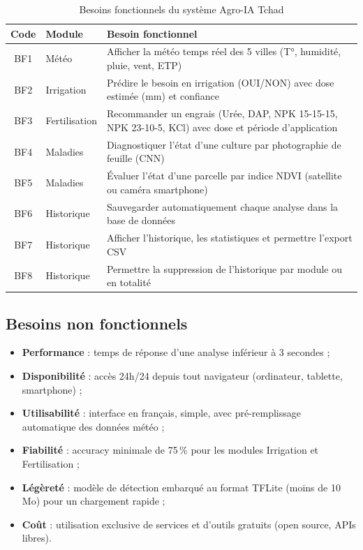 \begin{table}[H]
	\centering
	\caption{Besoins fonctionnels du système Agro-IA Tchad}
	\label{tab:besoins_fonc}
	\small
	\begin{tabularx}{\textwidth}{clX}
		\toprule
		\textbf{Code} & \textbf{Module} & \textbf{Besoin fonctionnel} \\
		\midrule
		BF1 & Météo         & Afficher la météo temps réel des 5 villes
		(T°, humidité, pluie, vent, ETP) \\
		BF2 & Irrigation    & Prédire le besoin en irrigation (OUI/NON)
		avec dose estimée (mm) et confiance \\
		BF3 & Fertilisation & Recommander un engrais (Urée, DAP, NPK
		15-15-15, NPK 23-10-5, KCl) avec dose et
		période d'application \\
		BF4 & Maladies      & Diagnostiquer l'état d'une culture par
		photographie de feuille (CNN) \\
		BF5 & Maladies      & Évaluer l'état d'une parcelle par indice
		NDVI (satellite ou caméra smartphone) \\
		BF6 & Historique    & Sauvegarder automatiquement chaque analyse
		dans la base de données \\
		BF7 & Historique    & Afficher l'historique, les statistiques et
		permettre l'export CSV \\
		BF8 & Historique    & Permettre la suppression de l'historique
		par module ou en totalité \\
		\bottomrule
	\end{tabularx}
\end{table}

\subsection{Besoins non fonctionnels}

\begin{itemize}[leftmargin=1.2cm]
	\item \textbf{Performance} : temps de réponse d'une analyse
	inférieur à 3 secondes ;
	\item \textbf{Disponibilité} : accès 24h/24 depuis tout
	navigateur (ordinateur, tablette, smartphone) ;
	\item \textbf{Utilisabilité} : interface en français, simple,
	avec pré-remplissage automatique des données météo ;
	\item \textbf{Fiabilité} : accuracy minimale de 75\,\% pour les
	modules Irrigation et Fertilisation ;
	\item \textbf{Légèreté} : modèle de détection embarqué au format
	TFLite (moins de 10 Mo) pour un chargement rapide ;
	\item \textbf{Coût} : utilisation exclusive de services et
	d'outils gratuits (open source, APIs libres).
\end{itemize}

